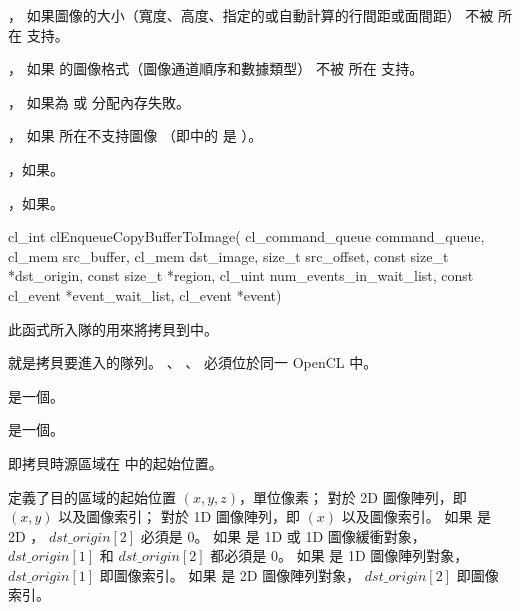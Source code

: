 \item {}，
如果圖像的大小（寬度、高度、指定的或自動計算的行間距或面間距）
不被  所在 支持。

\item {}，
如果  的圖像格式（圖像通道順序和數據類型）
不被  所在 支持。

\item {}，
如果為  或  分配內存失敗。

\item {}，
如果  所在不支持圖像
（即中的  是 ）。

\item {}，如果\scdevfailres。
\item {}，如果\schostfailres。
\stopigBase


\startCLFUNC
cl_int clEnqueueCopyBufferToImage(
			cl_command_queue command_queue,
			cl_mem src_buffer,
			cl_mem dst_image,
			size_t src_offset,
			const size_t *dst_origin,
			const size_t *region,
			cl_uint num_events_in_wait_list,
			const cl_event *event_wait_list,
			cl_event *event)
\stopCLFUNC

此函式所入隊的用來將拷貝到中。

 就是拷貝要進入的隊列。
、 、 
必須位於同一 OpenCL 中。

 是一個。

 是一個。

 即拷貝時源區域在  中的起始位置。

 定義了目的區域的起始位置 $(x, y, z)$，單位像素；
對於 2D 圖像陣列，即 $(x, y)$ 以及圖像索引；
對於 1D 圖像陣列，即 $(x)$ 以及圖像索引。
如果  是 2D ， $dst\_origin[2]$ 必須是 0。
如果  是 1D 或 1D 圖像緩衝對象，
$dst\_origin[1]$ 和 $dst\_origin[2]$ 都必須是 0。
如果  是 1D 圖像陣列對象， $dst\_origin[1]$ 即圖像索引。
如果  是 2D 圖像陣列對象， $dst\_origin[2]$ 即圖像索引。

